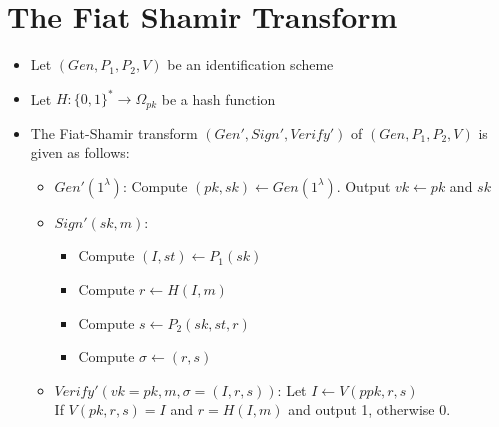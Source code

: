\section{The Fiat Shamir Transform}
    \begin{itemize}
        \item Let $(Gen,P_1,P_2,V)$ be an identification scheme
        \item Let $H: \{0,1\}^* \rightarrow \Omega_{pk}$ be a hash function
        \item The Fiat-Shamir transform $(Gen',Sign',Verify')$ of $(Gen,P_1,P_2,V)$ is given as follows:
        \begin{itemize}
            \item $Gen'(1^{\lambda})$: Compute $(pk,sk) \leftarrow Gen(1^{\lambda})$.
            Output $vk \leftarrow pk$ and $sk$
            \item $Sign'(sk,m)$:
            \begin{itemize}
                \item Compute $(I,st) \leftarrow P_1(sk)$
                \item Compute $r \leftarrow H(I,m)$
                \item Compute $s \leftarrow P_2(sk,st,r)$
                \item Compute $\sigma \leftarrow (r,s)$
            \end{itemize}
            \item $Verify'(vk=pk,m,\sigma = (I,r,s))$: Let $I \leftarrow V(ppk,r,s)$\\
            If $V(pk,r,s)=I$ and $r=H(I,m)$ and output 1, otherwise 0.
        \end{itemize}
    \end{itemize}

